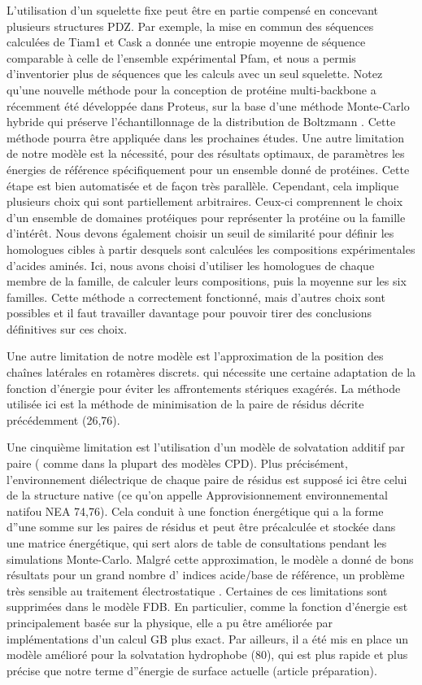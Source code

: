 L'utilisation d'un squelette fixe peut être en partie compensé en concevant plusieurs structures PDZ. Par exemple, la mise en commun des séquences calculées de Tiam1 et Cask a donnée une entropie moyenne de séquence comparable à celle de l'ensemble expérimental  Pfam, et nous a permis d'inventorier plus de séquences que les calculs avec un seul squelette. Notez qu'une nouvelle méthode pour la conception de protéine multi-backbone a récemment été développée dans Proteus, sur la base d'une méthode Monte-Carlo hybride qui préserve l'échantillonnage de la distribution de Boltzmann \cite{Druart17}. Cette méthode pourra être appliquée dans les prochaines études.
Une autre limitation de notre modèle est la nécessité, pour des résultats optimaux, de paramètres les énergies de référence spécifiquement pour un ensemble donné de protéines. Cette étape est bien automatisée et de façon très parallèle. Cependant, cela implique plusieurs choix qui sont partiellement arbitraires. Ceux-ci comprennent le choix d'un ensemble de domaines protéiques pour représenter la protéine ou la famille d'intérêt. Nous devons également choisir un seuil de similarité pour définir les homologues cibles à partir desquels sont calculées les compositions expérimentales d'acides aminés. Ici, nous avons choisi d'utiliser les homologues de chaque membre de la famille, de calculer leurs compositions, puis la moyenne sur les six familles. Cette méthode a correctement fonctionné, mais d'autres choix sont possibles et il faut travailler davantage pour pouvoir tirer des conclusions définitives sur ces choix.

Une autre limitation de notre modèle est l'approximation de  la position des chaînes latérales en rotamères discrets. qui nécessite une certaine adaptation de la fonction d'énergie pour éviter les affrontements stériques exagérés. La méthode utilisée ici est la méthode de minimisation de la paire de résidus décrite précédemment (26,76).

Une cinquième limitation est l'utilisation d'un modèle de solvatation additif par paire ( comme dans la plupart des modèles CPD). Plus précisément, l'environnement diélectrique de chaque paire de résidus est supposé ici être celui de la structure native (ce qu'on appelle \og Approvisionnement environnemental natif\fg ou NEA 74,76). Cela conduit à une fonction énergétique qui a la forme d''une somme sur les paires de résidus et peut être précalculée et stockée dans une matrice énergétique, qui sert alors de table de consultations pendant les simulations Monte-Carlo. Malgré cette approximation, le modèle a donné de bons résultats pour un grand nombre d' indices acide/base de référence, un problème très sensible au traitement électrostatique \cite{Polydorides13}. Certaines de ces limitations sont supprimées dans le modèle FDB. En particulier, comme la fonction d'énergie est principalement basée sur la physique, elle a pu être améliorée par implémentations d'un calcul GB plus exact. Par ailleurs, il a été mis en place un modèle amélioré pour la solvatation hydrophobe (80), qui est plus rapide et plus précise que notre terme d''énergie de surface actuelle (article préparation).

